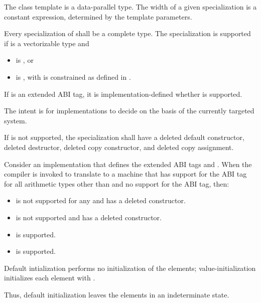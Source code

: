 \begin{itemdescr}
\begin{itemdescr}
\pnum
The class template  is a data-parallel type. The width of a given  specialization is a constant expression, determined by the template parameters.

\pnum
Every specialization of  shall be a complete type. The specialization  is supported if  is a vectorizable type and
\begin{itemize}
  \item {} is , or
  \item {} is , with  is constrained as defined in .
\end{itemize}

If  is an extended ABI tag, it is implementation-defined whether  is supported. \begin{note}The intent is for implementations to decide on the basis of the currently targeted system.\end{note}

If  is not supported, the specialization shall have a deleted default constructor, deleted destructor, deleted copy constructor, and deleted copy assignment.

\begin{example}
  Consider an implementation that defines the extended ABI tags  and . When the compiler is invoked to translate to a machine that has support for the  ABI tag for all arithmetic types other than  and no support for the  ABI tag, then:
  \begin{itemize}
    \item {} is not supported for any  and has a deleted constructor.
    \item {} is not supported and has a deleted constructor.
    \item {} is supported.
    \item {} is supported.
  \end{itemize}
\end{example}

\pnum
Default intialization performs no initialization of the elements; value-initialization initializes each element with . \begin{note}Thus, default initialization leaves the elements in an indeterminate state.\end{note}


\end{itemdescr}
\end{itemdescr}
